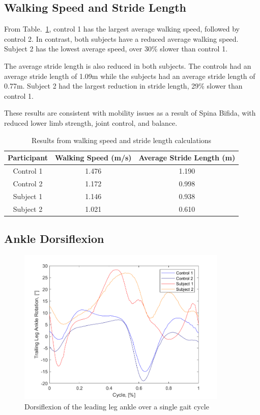\documentclass[conference]{IEEEtran}
\begin{document}
\subsection{Walking Speed and Stride Length}

From Table.~\ref{tab:speedStrideData}, control 1 has the largest average walking speed, followed by control 2. In contrast, both subjects have a reduced average walking speed. Subject 2 has the lowest average speed, over 30\% slower than control 1.

The average stride length is also reduced in both subjects. The controls had an average stride length of 1.09m while the subjects had an average stride length of 0.77m. Subject 2 had the largest reduction in stride length, 29\% slower than control 1.

These results are consistent with mobility issues as a result of Spina Bifida, with reduced lower limb strength, joint control, and balance. 

\begin{table}[h]
\centering
\begin{tabular}{|c|c|c|}
\hline
Participant & Walking Speed (m/s) & Average Stride Length (m) \\
\hline
Control 1 & 1.476 & 1.190 \\
Control 2 & 1.172 & 0.998 \\
Subject 1 & 1.146 & 0.938 \\
Subject 2 & 1.021 & 0.610 \\
\hline
\end{tabular}
\caption{Results from walking speed and stride length calculations}
\label{tab:speedStrideData}
\end{table}


\subsection{Ankle Dorsiflexion}

\begin{figure}[!ht]
\centering
\includegraphics[width=10cm]{leading leg ankle rotation.png}
\caption{Dorsiflexion of the leading leg ankle over a single gait cycle}
\label{fig:LeadingAnkleDorsiflexion}
\end{figure}
\end{document}
